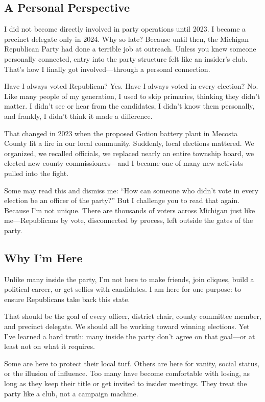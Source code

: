 \documentclass[12pt]{book}
\begin{document}
\subsection{A Personal Perspective}

I did not become directly involved in party operations until 2023. I became a precinct delegate only in 2024. Why so late? Because until then, the Michigan Republican Party had done a terrible job at outreach. Unless you knew someone personally connected, entry into the party structure felt like an insider's club. That’s how I finally got involved—through a personal connection.

Have I always voted Republican? Yes. Have I always voted in every election? No. Like many people of my generation, I used to skip primaries, thinking they didn’t matter. I didn’t see or hear from the candidates, I didn’t know them personally, and frankly, I didn’t think it made a difference.

That changed in 2023 when the proposed Gotion battery plant in Mecosta County lit a fire in our local community. Suddenly, local elections mattered. We organized, we recalled officials, we replaced nearly an entire township board, we elected new county commissioners—and I became one of many new activists pulled into the fight.

Some may read this and dismiss me: “How can someone who didn’t vote in every election be an officer of the party?” But I challenge you to read that again. Because I’m not unique. There are thousands of voters across Michigan just like me—Republicans by vote, disconnected by process, left outside the gates of the party.

\subsection{Why I'm Here}

Unlike many inside the party, I’m not here to make friends, join cliques, build a political career, or get selfies with candidates. I am here for one purpose: to ensure Republicans take back this state.

That should be the goal of every officer, district chair, county committee member, and precinct delegate. We should all be working toward winning elections. Yet I’ve learned a hard truth: many inside the party don’t agree on that goal—or at least not on what it requires.

Some are here to protect their local turf. Others are here for vanity, social status, or the illusion of influence. Too many have become comfortable with losing, as long as they keep their title or get invited to insider meetings. They treat the party like a club, not a campaign machine.
\end{document}
